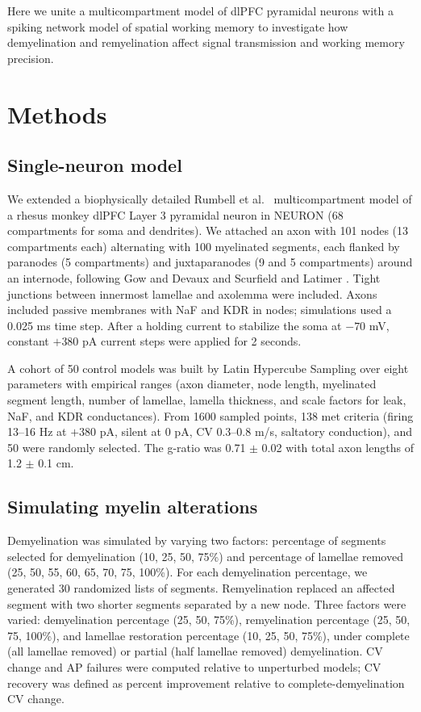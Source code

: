\documentclass[11pt]{article}
\begin{document}
Here we unite a multicompartment model of dlPFC pyramidal neurons with a spiking network model of spatial working memory to investigate how demyelination and remyelination affect signal transmission and working memory precision.

\section{Methods}
\subsection{Single-neuron model}
We extended a biophysically detailed Rumbell et al.\ \cite{rumbell2016dimensions} multicompartment model of a rhesus monkey dlPFC Layer 3 pyramidal neuron in NEURON \cite{carnevale2006neuron} (68 compartments for soma and dendrites). We attached an axon with 101 nodes (13 compartments each) alternating with 100 myelinated segments, each flanked by paranodes (5 compartments) and juxtaparanodes (9 and 5 compartments) around an internode, following Gow and Devaux \cite{gow2008extended} and Scurfield and Latimer \cite{scurfield2018diameter}. Tight junctions between innermost lamellae and axolemma were included. Axons included passive membranes with NaF and KDR in nodes; simulations used a 0.025 ms time step. After a holding current to stabilize the soma at $-70$ mV, constant $+380$ pA current steps were applied for 2 seconds.

A cohort of 50 control models was built by Latin Hypercube Sampling \cite{morris1995exploratory} over eight parameters with empirical ranges (axon diameter, node length, myelinated segment length, number of lamellae, lamella thickness, and scale factors for leak, NaF, and KDR conductances). From 1600 sampled points, 138 met criteria (firing 13--16 Hz at $+380$ pA, silent at 0 pA, CV 0.3--0.8 m/s, saltatory conduction), and 50 were randomly selected. The g-ratio was 0.71 $\pm$ 0.02 with total axon lengths of 1.2 $\pm$ 0.1 cm.

\subsection{Simulating myelin alterations}
Demyelination was simulated by varying two factors: percentage of segments selected for demyelination (10, 25, 50, 75\%) and percentage of lamellae removed (25, 50, 55, 60, 65, 70, 75, 100\%). For each demyelination percentage, we generated 30 randomized lists of segments. Remyelination replaced an affected segment with two shorter segments separated by a new node. Three factors were varied: demyelination percentage (25, 50, 75\%), remyelination percentage (25, 50, 75, 100\%), and lamellae restoration percentage (10, 25, 50, 75\%), under complete (all lamellae removed) or partial (half lamellae removed) demyelination. CV change and AP failures were computed relative to unperturbed models; CV recovery was defined as percent improvement relative to complete-demyelination CV change.
\end{document}
